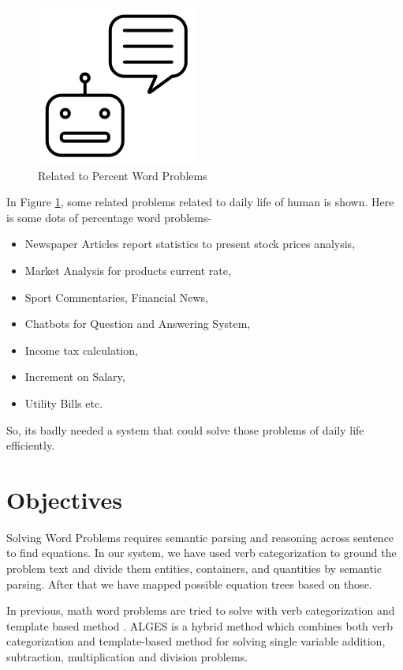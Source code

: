 \documentclass[document.tex]{subfiles}
\begin{document}
\begin{figure}[H]
\begin{multicols}{4}[\columnsep=2.0cm]
		\includegraphics[scale=0.35]{imgs/chatbot.png}
		
	\end{multicols}
	\caption {Related to Percent Word Problems\cite{googleimage}}
	\label{fig:relatedFig}
\end{figure}
In Figure \ref{fig:relatedFig}, some related problems related to daily life of human is shown. Here is some dots of percentage word problems-
\begin{itemize}
	\item  Newspaper Articles report statistics to present stock prices analysis,
	\item  Market Analysis for products current rate,
	\item  Sport Commentaries, Financial News,
	\item  Chatbots for Question and Answering System,
	\item Income tax calculation,
	\item Increment on Salary,
	\item Utility Bills etc.
\end{itemize}
So, its badly needed a system that could solve those problems of daily life efficiently.

\section{Objectives}

Solving Word Problems requires semantic parsing and reasoning across sentence to find equations. In our system, we have used verb categorization to ground the problem text and divide them entities, containers, and quantities by semantic parsing. After that we have mapped possible equation trees based on those.

In previous, math word problems are tried to solve with verb categorization \cite{1} and template based method \cite{2}. ALGES \cite{3} is a hybrid method which combines both verb categorization and template-based method for solving single variable addition, subtraction, multiplication and division problems.
\end{document}
